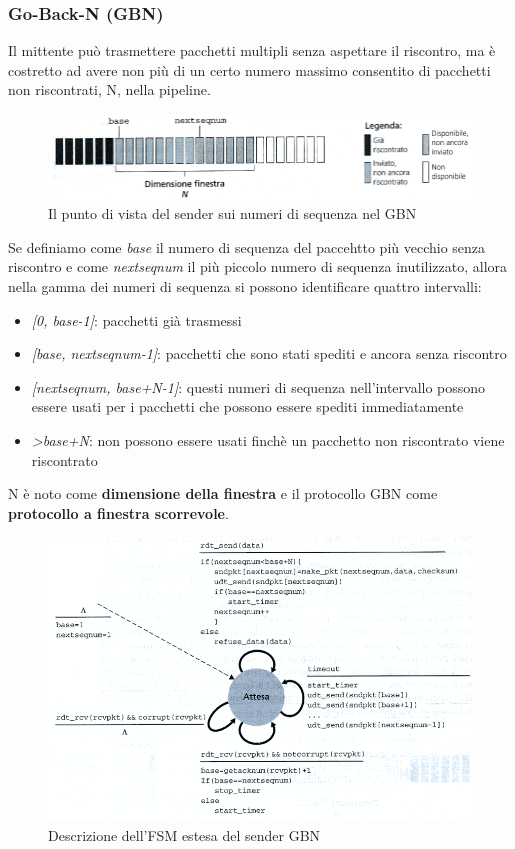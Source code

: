 \documentclass[11pt,a4paper]{article}
\begin{document}
\subsubsection{Go-Back-N (GBN)}
Il mittente può trasmettere pacchetti multipli senza aspettare il riscontro, ma è costretto ad avere non più di un certo numero massimo consentito di pacchetti non riscontrati, N, nella pipeline.
\begin{figure}
	\includegraphics[scale=0.6]{img/025.png}
	\caption{Il punto di vista del sender sui numeri di sequenza nel GBN}
\end{figure}
Se definiamo come \emph{base} il numero di sequenza del paccehtto più vecchio senza riscontro e come \emph{nextseqnum} il più piccolo numero di sequenza inutilizzato, allora nella gamma dei numeri di sequenza si possono identificare quattro intervalli:
\begin{itemize}
	\item \emph{[0, base-1]}: pacchetti già trasmessi
	\item \emph{[base, nextseqnum-1]}: pacchetti che sono stati spediti e ancora senza riscontro
	\item \emph{[nextseqnum, base+N-1]}: questi numeri di sequenza nell'intervallo possono essere usati per i pacchetti che possono essere spediti immediatamente
	\item \emph{>base+N}: non possono essere usati finchè un pacchetto non riscontrato viene riscontrato
\end{itemize}
N è noto come \textbf{dimensione della finestra} e il protocollo GBN come \textbf{protocollo a finestra scorrevole}.
\begin{figure}
	\includegraphics[scale=0.6]{img/026.png}
	\caption{Descrizione dell'FSM estesa del sender GBN}
\end{figure}
\end{document}
